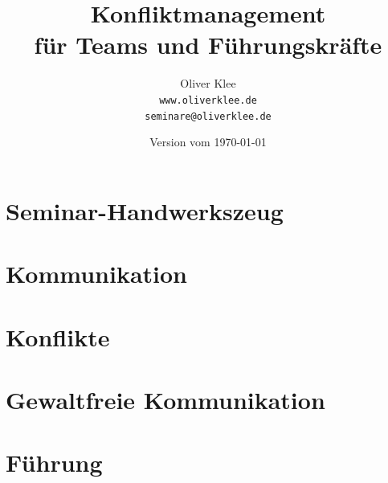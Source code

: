 \documentclass[a4paper,openany,twoside,titlepage,10pt,headsepline]{scrbook}
\title{Konfliktmanagement\\für Teams und Führungskräfte}
\author{Oliver Klee\\\texttt{www.oliverklee.de}\\\texttt{seminare@oliverklee.de}}
\date{Version vom \today}
\begin{document}
    \frontmatter

    \maketitle

    \tableofcontents


    \mainmatter


    \chapter{Seminar-Handwerkszeug}
    
    
    
    
    


    \chapter{Kommunikation}
    
    
    


    \chapter{Konflikte}
    
    
    
    
    
    
    
    
    


    \chapter{Gewaltfreie Kommunikation}
    
    
    
    
    
    
    
    


    \chapter{Führung}
    
    
    
    

    \backmatter

    

    

    \printindex
\end{document}
